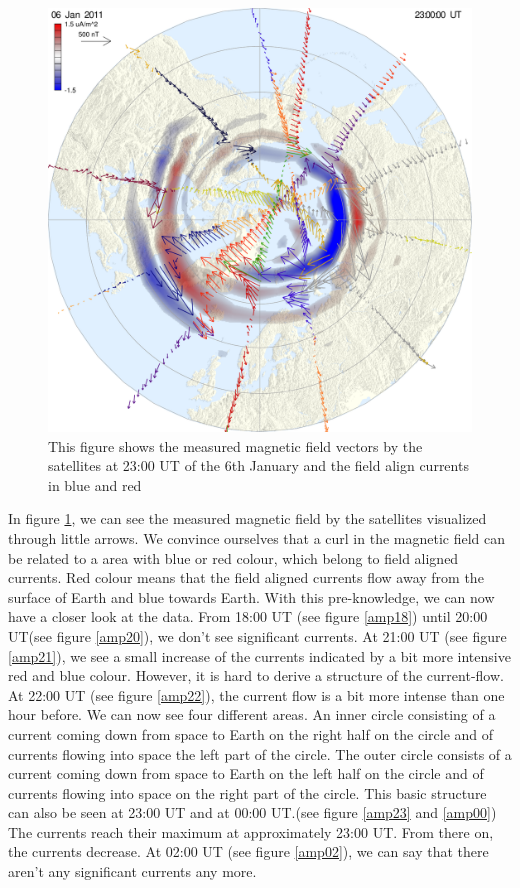 \documentclass[10pt,a4paper]{article}
\begin{document}
\begin{figure}[h]
\centering
\includegraphics[scale=0.3]{summary_better_exp.pdf}
\caption{This figure shows the measured magnetic field vectors by the satellites at 23:00 UT of the 6th January and the field align currents in blue and red}
\label{AMPERE_explonation}
\end{figure}
In figure \ref{AMPERE_explonation}, we can see the measured magnetic field by the satellites visualized through little arrows. We convince ourselves that a curl in the magnetic field can be related to a area with blue or red colour, which belong to field aligned currents. Red colour means that the field aligned currents flow away from the surface of Earth and blue towards Earth. 
With this pre-knowledge, we can now have a closer look at the data. From 18:00 UT (see figure \ref{amp18}) until 20:00 UT(see figure \ref{amp20}), we don't see significant currents. At 21:00 UT (see figure \ref{amp21}), we see a small increase of the currents indicated by a bit more intensive red and blue colour. However, it is hard to derive a structure of the current-flow. At 22:00 UT (see figure \ref{amp22}), the current flow is a bit more intense than one hour before. We can now see four different areas. An inner circle consisting of a current coming down from space to Earth on the right half on the circle and of currents flowing into space the left part of the circle. The outer circle consists of a current coming down from space to Earth on the left half on the circle and of currents flowing into space on the right part of the circle. This basic structure can also be seen at 23:00 UT and at 00:00 UT.(see figure \ref{amp23} and \ref{amp00}) 
The currents reach their maximum at approximately 23:00 UT. From there on, the currents decrease. At 02:00 UT (see figure \ref{amp02}), we can say that there aren't any significant currents any more. 
\end{document}
